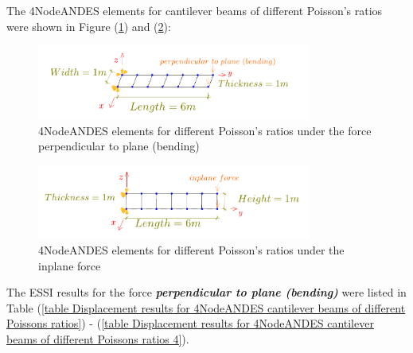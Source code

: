 \documentclass[fleqn,11pt,letter]{article}
\begin{document}
The 4NodeANDES elements for cantilever beams of different Poisson's ratios were shown in Figure (\ref{fig 4NodeANDES elements for cantilever beams of different Poisson's ratios}) and (\ref{fig 4NodeANDES elements for cantilever beams of different Poisson's ratios 2}):

\begin{figure}[H]
  \centering
  \includegraphics[width=9cm]{../Figure_files/4NodeANDES/beam_ANDES_xy_bending_6div.pdf}
  \captionsetup{justification=centering,margin=3cm}
  \caption{4NodeANDES elements for different Poisson's ratios under the force perpendicular to plane (bending)}
  \label{fig 4NodeANDES elements for cantilever beams of different Poisson's ratios}
\end{figure}


\begin{figure}[H]
  \centering
  \includegraphics[width=9cm]{../Figure_files/4NodeANDES/beam_ANDES_yz_inPlane_6div.pdf}
  \captionsetup{justification=centering,margin=3cm}
  \caption{4NodeANDES elements for different Poisson's ratios under the inplane force}
  \label{fig 4NodeANDES elements for cantilever beams of different Poisson's ratios 2}
\end{figure}


The ESSI results for the force \textbf{\emph{perpendicular to plane (bending)}} were listed in Table (\ref{table Displacement results for 4NodeANDES cantilever beams of different Poissons ratios}) - (\ref{table Displacement results for 4NodeANDES cantilever beams of different Poissons ratios 4}).
\end{document}
